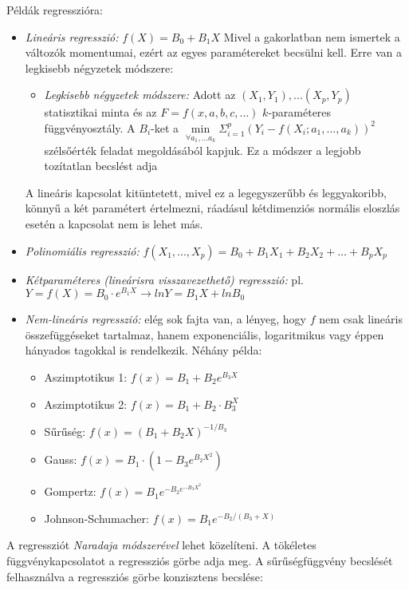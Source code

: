Példák regresszióra:
\begin{itemize}

\item \emph{Lineáris regresszió:} $f(X) = B_0 + B_1X$ Mivel a gakorlatban nem ismertek a változók momentumai, ezért az egyes paramétereket becsülni kell. Erre van a legkisebb négyzetek módszere:
\begin{itemize}
\item \emph{Legkisebb négyzetek módszere:} Adott az $(X_1,Y_1), ... (X_p,Y_p)$ statisztikai minta és az $F = {f(x,a,b,c,...)}$ $k$-paraméteres függvényosztály. A $B_i$-ket a $\min\limits_{\forall a_1, ... a_k} \Sigma_{i=1}^p(Y_i - f(X_i; a_1, ..., a_k))^2$ szélsőérték feladat megoldásából kapjuk. Ez a módszer a legjobb tozítatlan becslést adja
\end{itemize}

A lineáris kapcsolat kitüntetett, mivel ez a legegyszerűbb és leggyakoribb, könnyű a két paramétert értelmezni, ráadásul kétdimenziós normális eloszlás esetén a kapcsolat nem is lehet más.

\item \emph{Polinomiális regresszió:} $f(X_1, ..., X_p) = B_0 + B_1X_1+B_2X_2+ ...+ B_pX_p$

\item \emph{Kétparaméteres (lineárisra visszavezethető) regresszió:} pl. $Y=f(X)=B_0\cdot e^{B_1X} \rightarrow lnY = B_1X + lnB_0$

\item \emph{Nem-lineáris regresszió:} elég sok fajta van, a lényeg, hogy $f$ nem csak lineáris összefüggéseket tartalmaz, hanem exponenciális, logaritmikus vagy éppen hányados tagokkal is rendelkezik. Néhány példa:
	\begin{itemize}
	\item Aszimptotikus 1: $f(x) = B_1 + B_2 e^{B_3X}$
	\item Aszimptotikus 2: $f(x) = B_1 + B_2 \cdot B_3^X$
	\item Sűrűség: $f(x) = (B_1 + B_2 X)^{-1/B_3}$
	\item Gauss: $f(x) = B_1 \cdot (1- B_3 e^{B_2X^2})$
	\item Gompertz: $f(x) = B_1 e^{ -B_2 e^{-B_3X^2}}$
	\item Johnson-Schumacher: $f(x) = B_1 e^{ -B_2 /(B_3 + X)}$
	\end{itemize}
\end{itemize}

A regressziót \emph{Naradaja módszerével} lehet közelíteni. A tökéletes függvénykapcsolatot a regressziós görbe adja meg. A sűrűségfüggvény becslését felhasználva a regressziós görbe konzisztens becslése:

